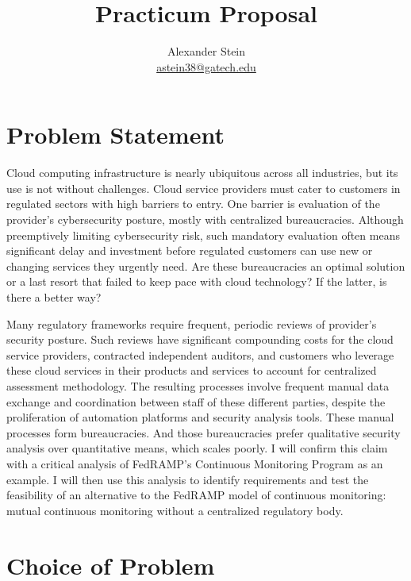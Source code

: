 \documentclass{jdf}
\begin{document}
\title{Practicum Proposal}
\author{Alexander Stein \\ \href{mailto:astein38@gatech.edu}{astein38@gatech.edu}}

\maketitle
\thispagestyle{fancy}

\section{Problem Statement}

Cloud computing infrastructure is nearly ubiquitous across all industries, but its use is not without challenges. Cloud service providers must cater to customers in regulated sectors with high barriers to entry. One barrier is evaluation of the provider's cybersecurity posture, mostly with centralized bureaucracies. Although preemptively limiting cybersecurity risk, such mandatory evaluation often means significant delay and investment before regulated customers can use new or changing services they urgently need. Are these bureaucracies an optimal solution or a last resort that failed to keep pace with cloud technology? If the latter, is there a better way?

Many regulatory frameworks require frequent, periodic reviews of provider's security posture. Such reviews have significant compounding costs for the cloud service providers, contracted independent auditors, and customers who leverage these cloud services in their products and services to account for centralized assessment methodology. The resulting processes involve frequent manual data exchange and coordination between staff of these different parties, despite the proliferation of automation platforms and security analysis tools. These manual processes form bureaucracies. And those bureaucracies prefer qualitative security analysis over quantitative means, which scales poorly. I will confirm this claim with a critical analysis of FedRAMP's Continuous Monitoring Program \citeyear[p.~18]{fedramp_auth_playbook} as an example. I will then use this analysis to identify requirements and test the feasibility of an alternative to the FedRAMP model of continuous monitoring: mutual continuous monitoring without a centralized regulatory body.

\section{Choice of Problem}
\end{document}
